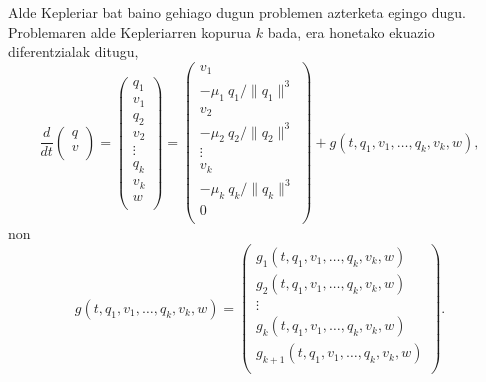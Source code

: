 Alde Kepleriar bat baino gehiago dugun problemen azterketa egingo dugu. Problemaren alde Kepleriarren kopurua $k$ bada, era honetako ekuazio diferentzialak ditugu,
\begin{equation*}
\frac{d}{dt}\left(\begin{array}{c}
                q  \\
                v  \\
\end{array}\right)=
\left(\begin{array}{c}
                q_1  \\
                v_1  \\
                q_2  \\
                v_2  \\
                \vdots \\
                q_k    \\
                v_k    \\
                w      \\
\end{array}\right)=
\left(\begin{array}{c}
                v_1  \\
                -\mu_1 \ q_1/\|q_1\|^3  \\
                v_2  \\
                -\mu_2 \ q_2/\|q_2\|^3  \\
                \vdots \\
                v_k    \\
                -\mu_k \ q_k/\|q_k\|^3  \\
                0      \\
\end{array}\right)+
g(t,q_1,v_1,\dots, q_k,v_k,w),
\end{equation*} 
non 
\begin{equation*}
g(t,q_1,v_1,\dots, q_k,v_k,w)=
\left(\begin{array}{c}
                g_1(t,q_1,v_1,\dots, q_k,v_k,w)      \\
                g_2 (t,q_1,v_1,\dots, q_k,v_k,w)     \\
                \vdots   \\
                g_k (t,q_1,v_1,\dots, q_k,v_k,w)      \\
                g_{k+1}(t,q_1,v_1,\dots, q_k,v_k,w)    \\
\end{array}\right).
\end{equation*}

